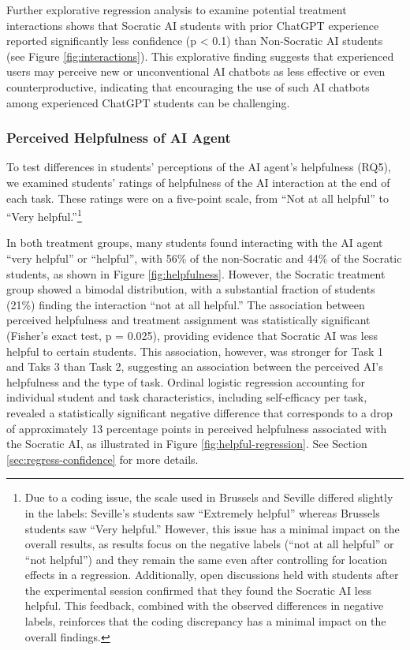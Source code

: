 \documentclass[
  12pt,
]{article}
\begin{document}
Further explorative regression analysis to examine potential treatment interactions shows that Socratic AI students with prior ChatGPT experience reported significantly less confidence (p \textless{} 0.1) than Non-Socratic AI students (see Figure \ref{fig:interactions}). This explorative finding suggests that experienced users may perceive new or unconventional AI chatbots as less effective or even counterproductive, indicating that encouraging the use of such AI chatbots among experienced ChatGPT students can be challenging.

\subsubsection{Perceived Helpfulness of AI Agent}\label{perceived-helpfulness-of-ai-agent}

To test differences in students' perceptions of the AI agent's helpfulness (RQ5), we examined students' ratings of helpfulness of the AI interaction at the end of each task. These ratings were on a five-point scale, from ``Not at all helpful'' to ``Very helpful.''\footnote{Due to a coding issue, the scale used in Brussels and Seville differed slightly in the labels: Seville's students saw ``Extremely helpful'' whereas Brussels students saw ``Very helpful.'' However, this issue has a minimal impact on the overall results, as results focus on the negative labels (``not at all helpful'' or ``not helpful'') and they remain the same even after controlling for location effects in a regression. Additionally, open discussions held with students after the experimental session confirmed that they found the Socratic AI less helpful. This feedback, combined with the observed differences in negative labels, reinforces that the coding discrepancy has a minimal impact on the overall findings.}

In both treatment groups, many students found interacting with the AI agent ``very helpful'' or ``helpful'', with 56\% of the non-Socratic and 44\% of the Socratic students, as shown in Figure \ref{fig:helpfulness}. However, the Socratic treatment group showed a bimodal distribution, with a substantial fraction of students (21\%) finding the interaction ``not at all helpful.'' The association between perceived helpfulness and treatment assignment was statistically significant (Fisher's exact test, p = 0.025), providing evidence that Socratic AI was less helpful to certain students. This association, however, was stronger for Task 1 and Taks 3 than Task 2, suggesting an association between the perceived AI's helpfulness and the type of task. Ordinal logistic regression accounting for individual student and task characteristics, including self-efficacy per task, revealed a statistically significant negative difference that corresponds to a drop of approximately 13 percentage points in perceived helpfulness associated with the Socratic AI, as illustrated in Figure \ref{fig:helpful-regression}. See Section \ref{sec:regress-confidence} for more details.
\end{document}
